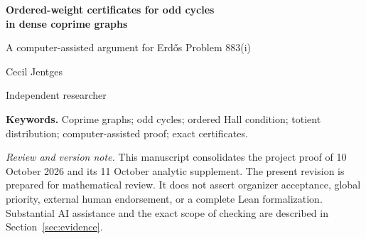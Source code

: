 

\thispagestyle{plain}
\begin{center}
{\LARGE\bfseries Ordered-weight certificates for odd cycles\\[4pt] in dense coprime graphs\par}
\vspace{9pt}
{\large A computer-assisted argument for Erd\H{o}s Problem 883(i)\par}
\vspace{12pt}
{\large Cecil Jentges\par}
{\small Independent researcher\par}
\vspace{6pt}
{\small\version\par}
\end{center}
\begin{abstract}
For $A\subseteq\{1,\ldots,n\}$, let $G(A)$ join distinct integers precisely when they are coprime. We present a computer-assisted proof that
$|A|>\lfloor n/2\rfloor+\lfloor n/3\rfloor-\lfloor n/6\rfloor$
forces every odd cycle of length at most $\lfloor n/3\rfloor+1$, for every $n$.
The central construction chooses an odd skeleton and fills its gaps with distinct common neighbors. An adjusted totient weight absorbs a finite inclusion--exclusion error into a product bound. Ordering the interior skeleton by this weight bounds the number of deficient connector lists using a single cumulative count, rather than a separate transition count for each divisibility signature. Even connectors and arbitrary unused connectors provide complementary certificates. Explicit finite-prefix distribution bounds cover all $n\ge10^8$; smaller parameters are covered by arithmetic certificates and proof-producing satisfiability computations. The supporting certificate archive is an integral part of the argument. We separate the reusable graph-theoretic mechanism, the arithmetic specialization, the finite evidence, and the independently attributed resolution of the second question.
\end{abstract}
\noindent\textbf{Keywords.} Coprime graphs; odd cycles; ordered Hall condition; totient distribution; computer-assisted proof; exact certificates.

\medskip
\noindent\textit{Review and version note.}
This manuscript consolidates the project proof of 10 October 2026 and its 11 October analytic supplement. The present revision is prepared for mathematical review. It does not assert organizer acceptance, global priority, external human endorsement, or a complete Lean formalization. Substantial AI assistance and the exact scope of checking are described in Section~\ref{sec:evidence}.

